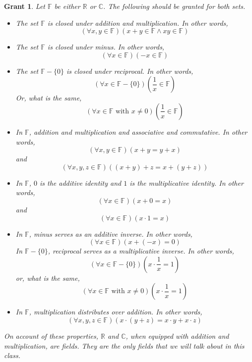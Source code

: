 \documentclass[12pt]{article}
\newcounter{prmc}
\newtheorem{grt}[prmc]{Grant}
\begin{document}
\begin{grt}

  Let $\mathbb{F}$ be either $\mathbb{R}$ or $\mathbb{C}$.  The
  following should be granted for both sets.
  
  \begin{itemize}
  \item The set $\mathbb{F}$ is closed under addition and multiplication.  In other words,
    $$(\forall x,y\in \mathbb{F}) (x+y\in\mathbb{F}\wedge
    xy\in\mathbb{F})$$
  \item The set $\mathbb{F}$ is closed under minus.  In other words,
    $$(\forall x\in \mathbb{F}) (-x\in\mathbb{F})$$
  \item The set $\mathbb{F}-\{0\}$ is closed under reciprocal.  In other
    words,
    $$(\forall x\in \mathbb{F}-\{0\}) (\frac{1}{x}\in\mathbb{F})$$
    Or, what is the same,
    $$(\forall x\in \mathbb{F} \textrm{ with } x\neq 0) (\frac{1}{x}\in\mathbb{F})$$
  \item In $\mathbb{F}$, addition and multiplication and
    associative and commutative. In other words,
    $$(\forall x,y\in \mathbb{F}) (x+y=y+x)$$
    and
    $$(\forall x,y,z\in \mathbb{F}) ((x+y)+z=x+(y+z)) $$
  \item In $\mathbb{F}$, $0$ is the additive identity and $1$ is the
    multiplicative identity. In other words,
    $$(\forall x\in\mathbb{F}) (x+0=x)$$
    and
    $$(\forall x\in\mathbb{F}) (x\cdot 1=x)$$
  \item In $\mathbb{F}$, minus serves as an 
    additive inverse.  In other words,
    $$(\forall x\in\mathbb{F}) (x+(-x)=0)$$ In $\mathbb{F}-\{0\}$,
    reciprocal serves as a multiplicative inverse.  In other words,
    $$(\forall x\in\mathbb{F}-\{0\}) (x\cdot\frac{1}{x}=1)$$
    or, what is the same,
    $$(\forall x\in\mathbb{F}\textrm{ with }x\neq 0)(x\cdot\frac{1}{x}=1)$$
  \item In $\mathbb{F}$, multiplication distributes over addition.  In
    other words,
    $$(\forall x,y,z\in\mathbb{F}) (x\cdot (y+z)=x\cdot y + x\cdot z)$$
  \end{itemize}

  On account of these properties, $\mathbb{R}$ and $\mathbb{C}$, when
  equipped with addition and multiplication, are fields.  They are the
  only fields that we will talk about in this class.
\end{grt}
  
\end{document}
